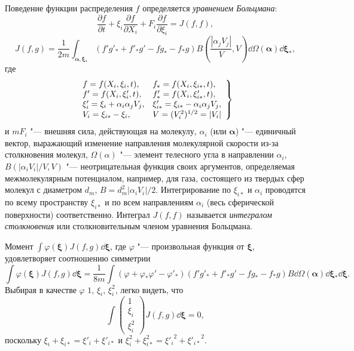 Поведение функции распределения \(f\) определяется \textit{уравнением Больцмана}:
\begin{equation}\label{eq:Boltzmann}
	\frac{\partial f}{\partial t} + \xi_i\frac{\partial f}{\partial X_i}
	+ F_i\frac{\partial f}{\partial\xi_i} = J(f,f),
\end{equation}
\begin{equation}\label{eq:integral}
	J(f,g) = \frac1{2m}\int_{\boldsymbol\alpha,\boldsymbol\xi_*}
	(f'g'_*+f'_*g'-fg_*-f_*g) B\left(\frac{|\alpha_j V_j|}{V},V\right)\dd\Omega(\boldsymbol\alpha)\boldsymbol{\dd\xi_*},
\end{equation}
где
\[ \left.\begin{array}{l l}
	f=f(X_i,\xi_i,t), & f_*=f(X_i,\xi_{i*},t), \\
	f'=f(X_i,\xi_i',t), & f'_*=f(X_i,\xi'_{i*},t), \\
	\xi_i'=\xi_i+\alpha_i\alpha_j V_j, & \xi_{i*}'=\xi_{i*}-\alpha_i\alpha_j V_j, \\
	V_i=\xi_{i*}-\xi_i, & V=(V_i^2)^{1/2} = |V_i| \\
\end{array}\right\}\]
и \(mF_i\) "--- внешняя сила, действующая на молекулу, \(\alpha_i\) (или \(\boldsymbol\alpha\)) "--- единичный вектор,
выражающий изменение направления молекулярной скорости из-за столкновения молекул,
\(\Omega(\alpha)\) "--- элемент телесного угла в направлении \(\alpha_i\),
\(B(|\alpha_i V_i|/V,V)\) "--- неотрицательная функция своих аргументов, определяемая межмолекулярным потенциалом,
например, для газа, состоящего из твердых сфер молекул с диаметром \(d_m\), \(B=d_m^2 |\alpha_i V_i|/2\).
Интегрирование по \(\xi_{i*}\) и \(\alpha_i\) проводятся по всему пространству \(\xi_{i*}\) и
по всем направлениям \(\alpha_i\) (весь сферической поверхности) соответственно.
Интеграл \(J(f,f)\) называется \textit{интегралом столкновения} или столкновительным членом уравнения Больцмана.

Момент \(\int\varphi(\boldsymbol\xi)J(f,g)\boldsymbol{\dd\xi}\), где \(\varphi\) "--- произвольная функция от \(\boldsymbol\xi\),
удовлетворяет соотношению симметрии
\[ \int\varphi(\boldsymbol\xi)J(f,g)\boldsymbol{\dd\xi} = \frac1{8m}\int(\varphi+\varphi_*\varphi'-\varphi'_*)
	(f'g'_*+f'_*g'-fg_*-f_*g) B\dd\Omega(\boldsymbol\alpha)\boldsymbol{\dd\xi_*}\boldsymbol{\dd\xi}. \]
Выбирая в качестве \(\varphi\) \(1\), \(\xi_i\), \(\xi_i^2\), легко видеть, что
\begin{equation}\label{eq:conser_moments}
	\int \begin{pmatrix} 1 \\ \xi_i \\ \xi_i^2 \end{pmatrix} J(f,g)\boldsymbol{\dd\xi}=0,
\end{equation}
поскольку \(\xi_i+\xi_{i*}=\xi'_i+\xi'_{i*}\) и \(\xi_i^2+\xi_{i*}^2={\xi'_i}^2+{\xi'_{i*}}^{\!\!\!2}\).

